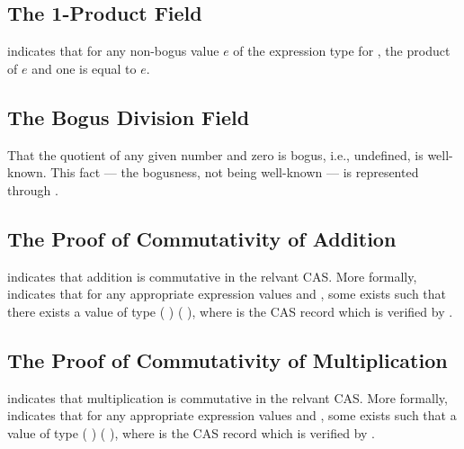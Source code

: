 \documentclass{report}
\begin{document}
\subsection{The 1-Product Field}
  indicates that for any non-bogus value \(e\) of the expression type for , the product of \(e\) and one is equal to \(e\).

\subsection{The Bogus Division Field}
That the quotient of any given number and zero is bogus, i.e., undefined, is well-known.  This fact --- the bogusness, not being well-known --- is represented through .

\subsection{The Proof of Commutativity of Addition}
 indicates that addition is commutative in the relvant CAS.  More formally,   indicates that for any appropriate expression values  and , some  exists such that there exists a value of type   \AgdaSymbol(   \AgdaSymbol) \AgdaSymbol(   \AgdaSymbol), where  is the CAS record which is verified by .

\subsection{The Proof of Commutativity of Multiplication}
 indicates that multiplication is commutative in the relvant CAS.  More formally,   indicates that for any appropriate expression values  and , some  exists such that a value of type   \AgdaSymbol(   \AgdaSymbol) \AgdaSymbol(   \AgdaSymbol), where  is the CAS record which is verified by .
\end{document}
